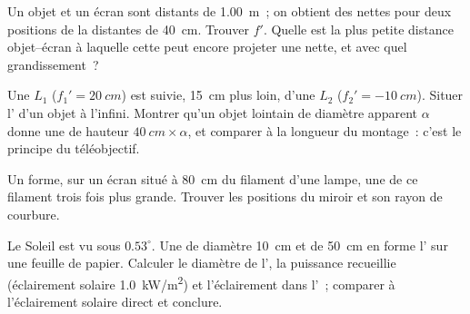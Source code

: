 \begin{exercise}[$\star\star$]\label{exo:b1:mirrors-thin-lenses:9}
Un objet et un écran sont distants de \qty{1.00}{m}~; on obtient des
 nettes pour deux positions de la  distantes de
\qty{40}{cm}. Trouver $f'$. Quelle est la plus petite distance
objet--écran à laquelle cette  peut encore projeter une 
nette, et avec quel grandissement~?
\end{exercise}

\begin{exercise}[$\star\star\star$]\label{exo:b1:mirrors-thin-lenses:10}
Une  $L_1$ ($f_1' = \qty{20}{cm}$) est suivie,
\qty{15}{cm} plus loin, d'une  $L_2$
($f_2' = \qty{-10}{cm}$). Situer l' d'un objet à l'infini. Montrer
qu'un objet lointain de diamètre apparent $\alpha$ donne une  de
hauteur $\qty{40}{cm}\times\alpha$, et comparer à la longueur du
montage~: c'est le principe du téléobjectif.
\end{exercise}

\begin{exercise}[$\star\star\star$]\label{exo:b1:mirrors-thin-lenses:11}
Un  forme, sur un écran situé à \qty{80}{cm} du filament
d'une lampe, une  de ce filament trois fois plus grande. Trouver
les positions du miroir et son rayon de courbure.
\end{exercise}

\begin{exercise}[$\star\star\star$]\label{exo:b1:mirrors-thin-lenses:12}
Le Soleil est vu sous $0.53^\circ$. Une  de diamètre
\qty{10}{cm} et de  \qty{50}{cm} en forme l' sur une
feuille de papier. Calculer le diamètre de l', la puissance
recueillie (éclairement solaire \qty{1.0}{kW/m^2}) et l'éclairement dans
l'~; comparer à l'éclairement solaire direct et conclure.
\end{exercise}

